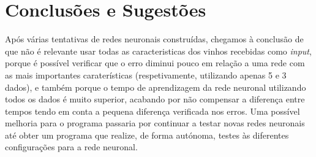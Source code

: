 \documentclass{article}
\begin{document}
\section{Conclusões e Sugestões}
Após várias tentativas de redes neuronais construídas, chegamos à conclusão de que não é relevante usar todas as caracteristicas dos vinhos recebidas como \textit{input}, porque é possível verificar que o erro diminui pouco em relação a uma rede com as mais importantes caraterísticas (respetivamente, utilizando apenas 5 e 3 dados), e também porque o tempo de aprendizagem da rede neuronal utilizando todos os dados é muito superior, acabando por não compensar a diferença entre tempos tendo em conta a pequena diferença verificada nos erros. Uma possível melhoria para o programa passaria por continuar a testar novas redes neuronais até obter um programa que realize, de forma autónoma, testes às diferentes configurações para a rede neuronal.
\vspace*{\fill}
\end{document}
